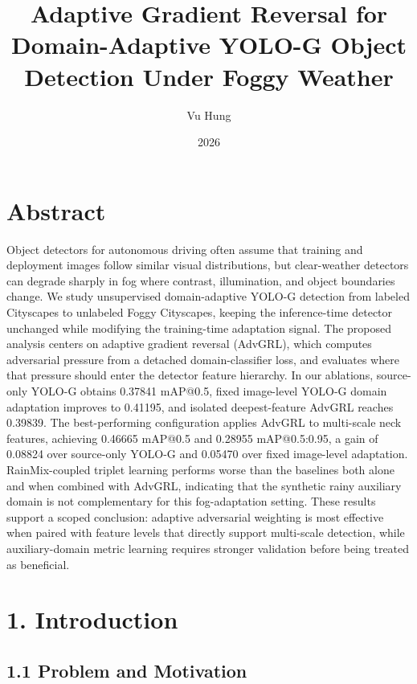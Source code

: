 \documentclass[
  11pt,
]{article}
\title{Adaptive Gradient Reversal for Domain-Adaptive YOLO-G Object
Detection Under Foggy Weather}
\author{Vu Hung}
\date{2026}
\begin{document}
\maketitle

\hypertarget{abstract}{%
\section{Abstract}\label{abstract}}

Object detectors for autonomous driving often assume that training and
deployment images follow similar visual distributions, but clear-weather
detectors can degrade sharply in fog where contrast, illumination, and
object boundaries change. We study unsupervised domain-adaptive YOLO-G
detection from labeled Cityscapes to unlabeled Foggy Cityscapes, keeping
the inference-time detector unchanged while modifying the training-time
adaptation signal. The proposed analysis centers on adaptive gradient
reversal (AdvGRL), which computes adversarial pressure from a detached
domain-classifier loss, and evaluates where that pressure should enter
the detector feature hierarchy. In our ablations, source-only YOLO-G
obtains 0.37841 mAP@0.5, fixed image-level YOLO-G domain adaptation
improves to 0.41195, and isolated deepest-feature AdvGRL reaches
0.39839. The best-performing configuration applies AdvGRL to multi-scale
neck features, achieving 0.46665 mAP@0.5 and 0.28955 mAP@0.5:0.95, a
gain of 0.08824 over source-only YOLO-G and 0.05470 over fixed
image-level adaptation. RainMix-coupled triplet learning performs worse
than the baselines both alone and when combined with AdvGRL, indicating
that the synthetic rainy auxiliary domain is not complementary for this
fog-adaptation setting. These results support a scoped conclusion:
adaptive adversarial weighting is most effective when paired with
feature levels that directly support multi-scale detection, while
auxiliary-domain metric learning requires stronger validation before
being treated as beneficial.

\hypertarget{introduction}{%
\section{1. Introduction}\label{introduction}}

\hypertarget{problem-and-motivation}{%
\subsection{1.1 Problem and Motivation}\label{problem-and-motivation}}
\end{document}
